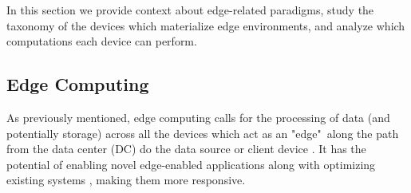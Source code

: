 
In this section we provide context about edge-related paradigms, study the taxonomy of the devices which materialize edge environments, and analyze which computations each device can perform.

\subsection{Edge Computing}

As previously mentioned, edge computing calls for the processing of data (and potentially storage) across all the devices which act as an "edge"\ along the path from the data center (DC) do the data source or client device \cite{Leitao2018}. It has the potential of enabling novel edge-enabled applications along with optimizing existing systems \cite{7488250}, making them more responsive.

%
%    
%
%    
%    

